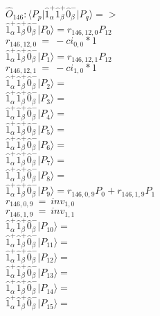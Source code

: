 \documentclass[14pt]{article}
\begin{document}
    $\hat{O}_{146}:  \langle{P_p}\vert \hat{1}_{\alpha}^{+}\hat{1}_{\beta}^{+}\hat{0}_{\beta}^{-} \vert{P_q}\rangle => $ \\ 
    $ \hat{1}_{\alpha}^{+}\hat{1}_{\beta}^{+}\hat{0}_{\beta}^{-} \vert{P_{0}}\rangle = {r}_{146,12,0}P_{12} $ \\ 
    ${r}_{146,12,0}\ =\ -{ci}_{0,0}*1 $ \\ 
    $ \hat{1}_{\alpha}^{+}\hat{1}_{\beta}^{+}\hat{0}_{\beta}^{-} \vert{P_{1}}\rangle = {r}_{146,12,1}P_{12} $ \\ 
    ${r}_{146,12,1}\ =\ -{ci}_{1,0}*1 $ \\ 
    $ \hat{1}_{\alpha}^{+}\hat{1}_{\beta}^{+}\hat{0}_{\beta}^{-} \vert{P_{2}}\rangle =  $ \\ 
    $ \hat{1}_{\alpha}^{+}\hat{1}_{\beta}^{+}\hat{0}_{\beta}^{-} \vert{P_{3}}\rangle =  $ \\ 
    $ \hat{1}_{\alpha}^{+}\hat{1}_{\beta}^{+}\hat{0}_{\beta}^{-} \vert{P_{4}}\rangle =  $ \\ 
    $ \hat{1}_{\alpha}^{+}\hat{1}_{\beta}^{+}\hat{0}_{\beta}^{-} \vert{P_{5}}\rangle =  $ \\ 
    $ \hat{1}_{\alpha}^{+}\hat{1}_{\beta}^{+}\hat{0}_{\beta}^{-} \vert{P_{6}}\rangle =  $ \\ 
    $ \hat{1}_{\alpha}^{+}\hat{1}_{\beta}^{+}\hat{0}_{\beta}^{-} \vert{P_{7}}\rangle =  $ \\ 
    $ \hat{1}_{\alpha}^{+}\hat{1}_{\beta}^{+}\hat{0}_{\beta}^{-} \vert{P_{8}}\rangle =  $ \\ 
    $ \hat{1}_{\alpha}^{+}\hat{1}_{\beta}^{+}\hat{0}_{\beta}^{-} \vert{P_{9}}\rangle = {r}_{146,0,9}P_{0}+{r}_{146,1,9}P_{1} $ \\ 
    ${r}_{146,0,9}\ =\ {inv}_{1,0} $ \\ 
    ${r}_{146,1,9}\ =\ {inv}_{1,1} $ \\ 
    $ \hat{1}_{\alpha}^{+}\hat{1}_{\beta}^{+}\hat{0}_{\beta}^{-} \vert{P_{10}}\rangle =  $ \\ 
    $ \hat{1}_{\alpha}^{+}\hat{1}_{\beta}^{+}\hat{0}_{\beta}^{-} \vert{P_{11}}\rangle =  $ \\ 
    $ \hat{1}_{\alpha}^{+}\hat{1}_{\beta}^{+}\hat{0}_{\beta}^{-} \vert{P_{12}}\rangle =  $ \\ 
    $ \hat{1}_{\alpha}^{+}\hat{1}_{\beta}^{+}\hat{0}_{\beta}^{-} \vert{P_{13}}\rangle =  $ \\ 
    $ \hat{1}_{\alpha}^{+}\hat{1}_{\beta}^{+}\hat{0}_{\beta}^{-} \vert{P_{14}}\rangle =  $ \\ 
    $ \hat{1}_{\alpha}^{+}\hat{1}_{\beta}^{+}\hat{0}_{\beta}^{-} \vert{P_{15}}\rangle =  $ \\ 
    
\end{document}
